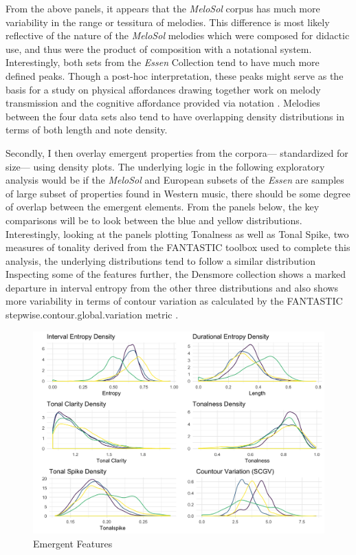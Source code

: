 \documentclass[12pt,]{book}
\begin{document}
From the above panels, it appears that the \emph{MeloSol} corpus has much more variability in the range or tessitura of melodies.
This difference is most likely reflective of the nature of the \emph{MeloSol} melodies which were composed for didactic use, and thus were the product of composition with a notational system.
Interestingly, both sets from the \emph{Essen} Collection tend to have much more defined peaks.
Though a post-hoc interpretation, these peaks might serve as the basis for a study on physical affordances drawing together work on melody transmission \citep{shanahanExaminingEffectOral2019} and the cognitive affordance provided via notation \citep{lerdahlCognitiveConstraintsCompositional1992}.
Melodies between the four data sets also tend to have overlapping density distributions in terms of both length and note density.

Secondly, I then overlay emergent properties from the corpora--- standardized for size--- using density plots.
The underlying logic in the following exploratory analysis would be if the \emph{MeloSol} and European subsets of the \emph{Essen} are samples of large subset of properties found in Western music, there should be some degree of overlap between the emergent elements.
From the panels below, the key comparisons will be to look between the blue and yellow distributions.
Interestingly, looking at the panels plotting Tonalness as well as Tonal Spike, two measures of tonality derived from the FANTASTIC toolbox used to complete this analysis, the underlying distributions tend to follow a similar distribution
Inspecting some of the features further, the Densmore collection shows a marked departure in interval entropy from the other three distributions and also shows more variability in terms of contour variation as calculated by the FANTASTIC stepwise.contour.global.variation metric \citep{mullensiefenFantasticFeatureANalysis2009}.

\begin{figure}

{\centering \includegraphics[width=1\linewidth]{img/corporaemergent} 

}

\caption{Emergent Features}\label{fig:compemergent}
\end{figure}
\end{document}
